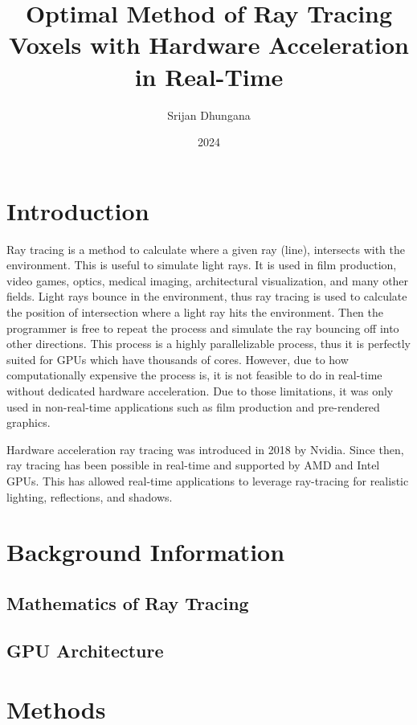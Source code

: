 \documentclass[12pt]{article}
\title{Optimal Method of Ray Tracing Voxels with Hardware Acceleration in Real-Time}
\author{Srijan Dhungana}
\date{2024}
\begin{document}
\maketitle
\clearpage

\tableofcontents
\clearpage

\section{Introduction}

Ray tracing is a method to calculate where a given ray (line), intersects with the environment.
This is useful to simulate light rays.
It is used in film production, video games, optics, medical imaging, architectural visualization, and many other fields.
Light rays bounce in the environment, thus ray tracing is used to calculate the position of intersection where a light ray hits the environment. 
Then the programmer is free to repeat the process and simulate the ray bouncing off into other directions.
This process is a highly parallelizable process, thus it is perfectly suited for GPUs which have thousands of cores.
However, due to how computationally expensive the process is, it is not feasible to do in real-time without dedicated hardware acceleration.
Due to those limitations, it was only used in non-real-time applications such as film production and pre-rendered graphics.

\bigskip

Hardware acceleration ray tracing was introduced in 2018 by Nvidia.
Since then, ray tracing has been possible in real-time and supported by AMD and Intel GPUs.
This has allowed real-time applications to leverage ray-tracing for realistic lighting, reflections, and shadows.



\section{Background Information}
\subsection{Mathematics of Ray Tracing}
\subsection{GPU Architecture}

\section{Methods}
\end{document}
